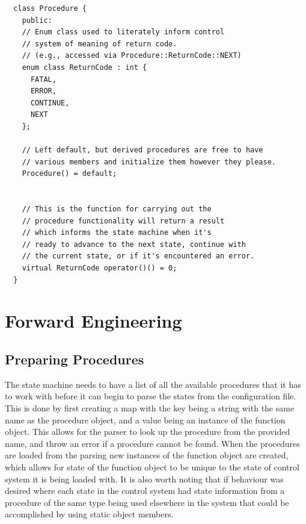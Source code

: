 \lstset{language=C++}
\begin{lstlisting}
  class Procedure {
    public:
    // Enum class used to literately inform control
    // system of meaning of return code.
    // (e.g., accessed via Procedure::ReturnCode::NEXT)
    enum class ReturnCode : int {
      FATAL,
      ERROR,
      CONTINUE,
      NEXT
    };

    // Left default, but derived procedures are free to have
    // various members and initialize them however they please.
    Procedure() = default;


    // This is the function for carrying out the
    // procedure functionality will return a result
    // which informs the state machine when it's
    // ready to advance to the next state, continue with
    // the current state, or if it's encountered an error.
    virtual ReturnCode operator()() = 0;
  }
\end{lstlisting}

\section{Forward Engineering}

\subsection{Preparing Procedures}

The state machine needs to have a list of all the available procedures that it
has to work with before it can begin to parse the states from the configuration
file.
This is done by first creating a map with the key being a string with the same
name as the procedure object, and a value being an instance of the function
object.
This allows for the parser to look up the procedure from the provided name, and
throw an error if a procedure cannot be found.
When the procedures are loaded from the parsing new instances of the function
object are created, which allows for state of the function object to be unique
to the state of control system it is being loaded with.
It is also worth noting that if behaviour was desired where each state in the
control system had state information from a procedure of the same type being
used elsewhere in the system that could be accomplished by using static object
members.


